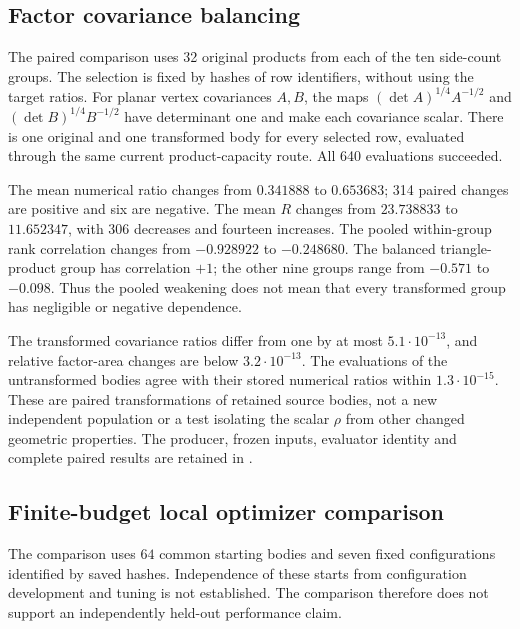 \subsection{Factor covariance balancing}\label{app:ds-balance}

The paired comparison uses 32 original products from each of the ten
side-count groups. The selection is fixed by hashes of row identifiers,
without using the target ratios. For planar vertex covariances $A,B$, the
maps $(\det A)^{1/4}A^{-1/2}$ and $(\det B)^{1/4}B^{-1/2}$ have determinant
one and make each covariance scalar. There is one original and one
transformed body for every selected row, evaluated through the same
current product-capacity route. All 640 evaluations succeeded.

The mean numerical ratio changes from $0.341888$ to $0.653683$; 314
paired changes are positive and six are negative. The mean $R$ changes
from $23.738833$ to $11.652347$, with 306 decreases and fourteen
increases. The pooled within-group rank correlation changes from
$-0.928922$ to $-0.248680$. The balanced triangle-product group has
correlation $+1$; the other nine groups range from $-0.571$ to $-0.098$.
Thus the pooled weakening does not mean that every transformed group has
negligible or negative dependence.

The transformed covariance ratios differ from one by at most
$5.1\cdot10^{-13}$, and relative factor-area changes are below
$3.2\cdot10^{-13}$. The evaluations of the untransformed bodies agree with their
stored numerical ratios within $1.3\cdot10^{-15}$.
These are paired transformations of retained source bodies, not a new
independent population or a test isolating the scalar $\rho$ from other
changed geometric properties. The producer, frozen inputs, evaluator
identity and complete paired results are retained in
.

\subsection{Finite-budget local optimizer comparison}
\label{app:ds-local-optimization}

The comparison uses \(64\) common starting bodies and seven fixed
configurations identified by saved hashes. Independence of these starts from
configuration development and tuning is not established. The comparison
therefore does not support an independently held-out performance claim.

